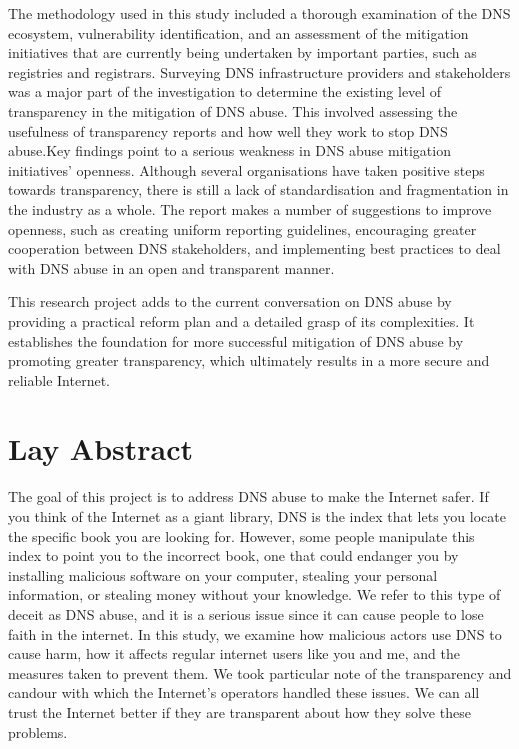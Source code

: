 \documentclass[a4paper,oneside,12pt]{book}
\numberwithin{equation}{chapter} %
\begin{document}
The methodology used in this study included a thorough examination of the DNS ecosystem, vulnerability identification, and an assessment of the mitigation initiatives that are currently being undertaken by important parties, such as registries and registrars. Surveying DNS infrastructure providers and stakeholders was a major part of the investigation to determine the existing level of transparency in the mitigation of DNS abuse. This involved assessing the usefulness of transparency reports and how well they work to stop DNS abuse.Key findings point to a serious weakness in DNS abuse mitigation initiatives' openness. Although several organisations have taken positive steps towards transparency, there is still a lack of standardisation and fragmentation in the industry as a whole. The report makes a number of suggestions to improve openness, such as creating uniform reporting guidelines, encouraging greater cooperation between DNS stakeholders, and implementing best practices to deal with DNS abuse in an open and transparent manner.

This research project adds to the current conversation on DNS abuse by providing a practical reform plan and a detailed grasp of its complexities. It establishes the foundation for more successful mitigation of DNS abuse by promoting greater transparency, which ultimately results in a more secure and reliable Internet.




\chapter*{Lay Abstract}

The goal of this project is to address DNS abuse to make the Internet safer. If you think of the Internet as a giant library, DNS is the index that lets you locate the specific book you are looking for. However, some people manipulate this index to point you to the incorrect book, one that could endanger you by installing malicious software on your computer, stealing your personal information, or stealing money without your knowledge. We refer to this type of deceit as DNS abuse, and it is a serious issue since it can cause people to lose faith in the internet. In this study, we examine how malicious actors use DNS to cause harm, how it affects regular internet users like you and me, and the measures taken to prevent them. We took particular note of the transparency and candour with which the Internet's operators handled these issues. We can all trust the Internet better if they are transparent about how they solve these problems. 
\end{document}
